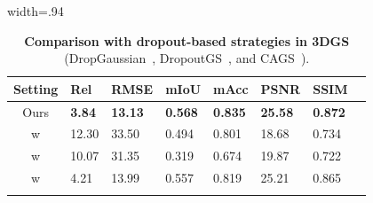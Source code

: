 \documentclass[runningheads]{llncs}
\begin{document}
\begin{table}[t]
\begin{minipage}[t]{0.48\textwidth}
\end{minipage}\hfill
\begin{minipage}[t]{0.48\textwidth}
  \vspace{0pt}
  \centering
  \caption{\textbf{Comparison with dropout-based strategies in 3DGS} (DropGaussian~\cite{dropgaussian}, DropoutGS~\cite{dropoutgs}, and CAGS~\cite{chen2025quantifying}).}
  \label{table:ablation_egd}
  \vspace{-3mm}
    \begin{adjustbox} {width=.94\linewidth}
    \begin{tabular}{ c | p{0.9cm}<{\centering} p{1.0cm}<{\centering} p{1.0cm}<{\centering} p{1.0cm}<{\centering} p{1.0cm}<{\centering} p{1.0cm}<{\centering}  p{1.0cm}<{\centering}  }
    \Xhline{3\arrayrulewidth}
    Setting & Rel  & RMSE  & mIoU  & mAcc  & PSNR  & SSIM    \\   
    \midrule[0.1pt]
    \rowcolor{lightblue} Ours  
    & \textbf{3.84} & \textbf{13.13} 
    & \textbf{0.568} & \textbf{0.835} 
    & \textbf{25.58} & \textbf{0.872}    \\ 
    \midrule[0.1pt]
    w \cite{dropgaussian}           & 12.30         & 33.50          & 0.494          & 0.801          & 18.68          & 0.734          \\ 
    w \cite{dropoutgs}              & 10.07         & 31.35          & 0.319          & 0.674          & 19.87          & 0.722        \\ 
    w \cite{chen2025quantifying}    & 4.21          & 13.99          & 0.557          & 0.819          & 25.21          & 0.865      \\ 
    \Xhline{3\arrayrulewidth}
    \end{tabular}
    \end{adjustbox}

\end{minipage}
\vspace{-3mm}
\end{table}
\end{document}
